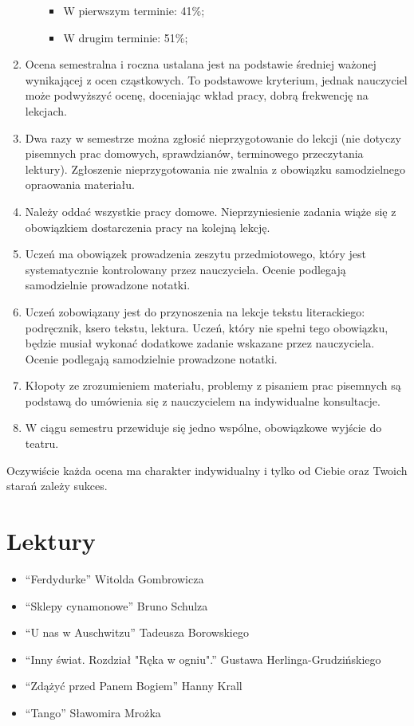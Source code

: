 \documentclass[a4paper]{article}
\begin{document}
\begin{enumerate}
\begin{itemize}
\begin{itemize}
            \item W pierwszym terminie: 41\%;
            \item W drugim terminie: 51\%;
        \end{itemize}
    \end{itemize}
    \item Ocena semestralna i roczna ustalana jest na podstawie średniej ważonej wynikającej z ocen
    cząstkowych. To podstawowe kryterium, jednak na\-uczyciel może podwyższyć ocenę, doceniając wkład pracy, dobrą frekwencję na lekcjach.
    \item Dwa razy w semestrze można zgłosić nieprzygotowanie do lekcji (nie dotyczy pisemnych prac domowych, sprawdzianów, terminowego przeczytania lektury).
    Zgłoszenie nieprzygotowania nie zwalnia z obowiązku samodzielnego opraowania materiału.
    \item Należy oddać wszystkie pracy domowe. Nieprzyniesienie zadania wiąże się z obowiązkiem dostarczenia pracy na kolejną lekcję.
    \item Uczeń ma obowiązek prowadzenia zeszytu przedmiotowego, który jest systematycznie kontrolowany przez nauczyciela. Ocenie podlegają samodzielnie prowadzone notatki.
    \item Uczeń zobowiązany jest do przynoszenia na lekcje tekstu literackiego: podręcznik, ksero tekstu, lektura. Uczeń, który nie spełni tego obowiązku, będzie musiał wykonać dodatkowe zadanie wskazane przez nauczyciela. Ocenie podlegają samodzielnie prowadzone notatki.
    \item Kłopoty ze zrozumieniem materiału, problemy z pisaniem prac pisemnych są podstawą do umówienia się z nauczycielem na indywidualne konsultacje.
    \item W ciągu semestru przewiduje się jedno wspólne, obowiązkowe wyjście do teatru.
\end{enumerate}
Oczywiście każda ocena ma charakter indywidualny i tylko od Ciebie oraz Twoich starań zależy sukces.
\section{Lektury}
\begin{itemize}
    \item ``Ferdydurke'' Witolda Gombrowicza
    \item ``Sklepy cynamonowe'' Bruno Schulza
    \item ``U nas w Auschwitzu'' Tadeusza Borowskiego
    \item ``Inny świat. Rozdział "Ręka w ogniu".'' Gustawa Herlinga-Grudzińskiego
    \item ``Zdążyć przed Panem Bogiem'' Hanny Krall
    \item ``Tango'' Sławomira Mrożka
\end{itemize}
\end{document}

